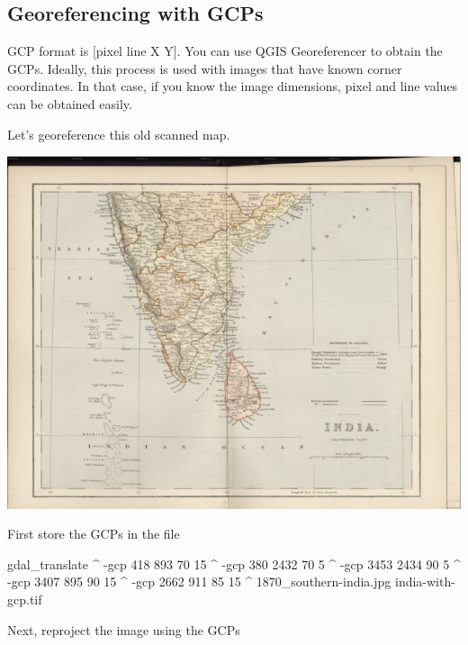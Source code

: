 \documentclass[12pt,a4paper]{article}
\newenvironment{Shaded}{\begin{snugshade}}{\end{snugshade}}
\newcommand{\ExtensionTok}[1]{#1}
\newcommand{\NormalTok}[1]{#1}
\begin{document}
\hypertarget{georeferencing-with-gcps}{%
\subsection{Georeferencing with GCPs}\label{georeferencing-with-gcps}}

GCP format is {[}pixel line X Y{]}. You can use QGIS Georeferencer to
obtain the GCPs. Ideally, this process is used with images that have
known corner coordinates. In that case, if you know the image
dimensions, pixel and line values can be obtained easily.

Let's georeference this old scanned map.

\begin{center}\includegraphics{images/gdal/scanned_map} \end{center}

First store the GCPs in the file

\begin{Shaded}
\begin{Highlighting}[]
\ExtensionTok{gdal_translate}\NormalTok{ ^}
  \ExtensionTok{-gcp}\NormalTok{ 418 893 70 15 ^}
  \ExtensionTok{-gcp}\NormalTok{ 380 2432 70 5 ^}
  \ExtensionTok{-gcp}\NormalTok{ 3453 2434  90 5 ^}
  \ExtensionTok{-gcp}\NormalTok{ 3407 895 90 15 ^}
  \ExtensionTok{-gcp}\NormalTok{ 2662 911 85 15 ^}
  \ExtensionTok{1870_southern-india.jpg}\NormalTok{ india-with-gcp.tif}
\end{Highlighting}
\end{Shaded}

Next, reproject the image using the GCPs
\end{document}
